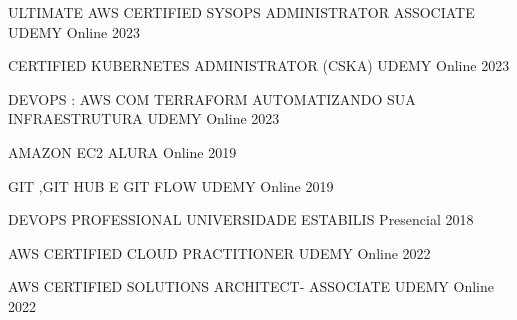 

\begin{cvhonors}

  \cvhonor
    {ULTIMATE AWS CERTIFIED SYSOPS ADMINISTRATOR ASSOCIATE} %
    {UDEMY} %
    {Online} %
    {2023} %

  \cvhonor
    {CERTIFIED KUBERNETES ADMINISTRATOR (CSKA)} %
    {UDEMY} %
    {Online} %
    {2023} %

  \cvhonor
    {DEVOPS : AWS COM TERRAFORM AUTOMATIZANDO SUA INFRAESTRUTURA} %
    {UDEMY} %
    {Online} %
    {2023} %

  \cvhonor
    {AMAZON EC2} %
    {ALURA} %
    {Online} %
    {2019} %

  \cvhonor
    {GIT ,GIT HUB E GIT FLOW} %
    {UDEMY} %
    {Online} %
    {2019} %

  \cvhonor
    {DEVOPS PROFESSIONAL} %
    {UNIVERSIDADE ESTABILIS} %
    {Presencial} %
    {2018} %


  \cvhonor
    {AWS CERTIFIED CLOUD PRACTITIONER} %
    {UDEMY} %
    {Online} %
    {2022} %

  \cvhonor
    {AWS CERTIFIED SOLUTIONS ARCHITECT- ASSOCIATE} %
    {UDEMY} %
    {Online} %
    {2022} %


\end{cvhonors}
